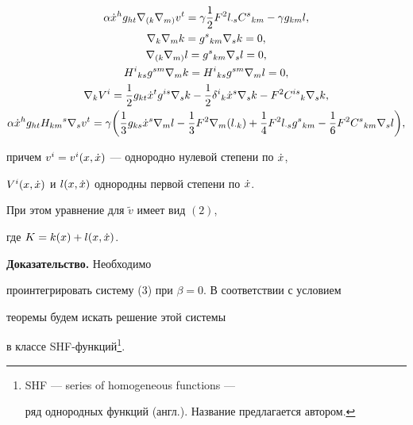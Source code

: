 \begin{thm}
\begin{gather}
\alpha \xt^{h}g_{ht}\nabla_{(k}\nabla_{m)}v^{t} = 


\gamma\frac{1}{2}F^{2}l_{\cdot s}C^{s}{}_{km} - \gamma g_{km}l, \\


\nabla_{k}\nabla_{m}k = g^{s}{}_{km}\nabla_{s}k = 0, \notag \\


\nabla_{(k}\nabla_{m)}l = g^{s}{}_{km}\nabla_{s}l = 0, \notag \\


H^{i}{}_{ks}g^{sm}\nabla_{m}k = H^{i}{}_{ks}g^{sm}\nabla_{m}l = 0,\notag \\


\nabla_{k}V^{i} = \frac{1}{2}g_{kt}\xt^{t}g^{is}\nabla_{s}k -


\frac{1}{2}\delta^{i}{}_{k}\xt^{s}\nabla_{s}k - 


F^{2}C^{is}{}_{k}\nabla_{s}k, \notag \\


\alpha \xt^{h}g_{ht}H_{km}{}^s\nabla_{s}v^{t} = 


\gamma \biggl(\frac{1}{3}g_{ks}\xt^{s}\nabla_{m}l -


\frac{1}{3}F^{2}\nabla_{m}(l_{\cdot k}) + 


\frac{1}{4}F^{2}l_{\cdot s}g^{s}{}_{km} - 


\frac{1}{6}F^{2}C^{s}{}_{km}\nabla_{s}l\biggr), \notag


\end{gather}


причем $v^{i} = v^{i}(x,\Dot x)$ --- однородно нулевой степени по $\Dot x $,


$V^{i}(x,\Dot x)$ и $l(x,\Dot x)$ однородны первой степени по $\Dot x$.


При этом уравнение для $\widetilde{v}$ имеет вид $(2)$,


где $K = k(x) + l(x,\Dot x)$.


\end{thm}


\addtocounter{footnote}{-1}





{\bf Доказательство.} Необходимо 


проинтегрировать систему (3) при $\beta = 0$. В соответствии с условием 


теоремы будем искать решение этой системы 


в классе SHF-функций\footnote{SHF --- series of homogeneous functions ---


ряд однородных функций (англ.). Название предлагается автором.}.





